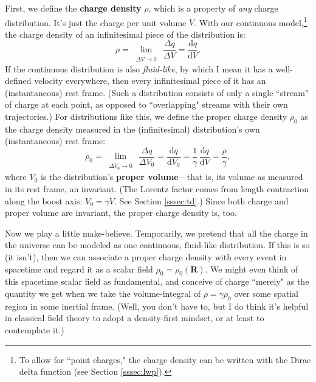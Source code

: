 \documentclass[12pt]{article}
\renewcommand{\vv}[1]{\mathbf{#1}}
\newcommand{\dd}[1]{\mathrm{d}#1}
\begin{document}
First, we define the \textbf{charge density} $\rho$, which is a property of \emph{any} charge distribution. It's just the charge per unit volume $V$. With our continuous model,\footnote{To allow for ``point charges," the charge density can be written with the Dirac delta function (see Section \ref{sssec:lwp}).} the charge density of an infinitesimal piece of the distribution is:
\begin{equation*}
\rho = \lim\limits_{\substack{\\ \Delta V \to 0}} \, \dfrac{\Delta q}{\Delta V} = \dfrac{\dd q}{\dd V} .
\end{equation*}
If the continuous distribution is also \emph{fluid-like}, by which I mean it has a well-defined velocity everywhere, then every infinitesimal piece of it has an (instantaneous) rest frame. (Such a distribution consists of only a single ``stream" of charge at each point, as opposed to ``overlapping" streams with their own trajectories.) For distributions like this, we define the proper charge density $\rho_0$ as the charge density measured in the (infinitesimal) distribution's own (instantaneous) rest frame:
\begin{equation*}
\rho_0 = \lim\limits_{\substack{\\ \Delta V_0 \to 0}} \, \dfrac{\Delta q}{\Delta V_0} = \dfrac{\dd q}{\dd V_0} = \dfrac{1}{\gamma} \, \dfrac{\dd q}{\dd V} = \dfrac{\rho}{\gamma},
\end{equation*}
where $V_0$ is the distribution's \textbf{proper volume}---that is, its volume as measured in its rest frame, an invariant. (The Lorentz factor comes from length contraction along the boost axis: $V_0 = \gamma V$. See Section \ref{sssec:td}.) Since both charge and proper volume are invariant, the proper charge density is, too.

Now we play a little make-believe. Temporarily, we pretend that all the charge in the universe can be modeled as one continuous, fluid-like distribution. If this is so (it isn't), then we can associate a proper charge density with every event in spacetime and regard it as a scalar field ${\rho_0 = \rho_0 (\vv R)}$. We might even think of this spacetime scalar field as fundamental, and conceive of charge ``merely" as the quantity we get when we take the volume-integral of $\rho = \gamma \rho_0$ over some spatial region in some inertial frame. (Well, you don't have to, but I do think it's helpful in classical field theory to adopt a density-first mindset, or at least to contemplate it.)
\end{document}
